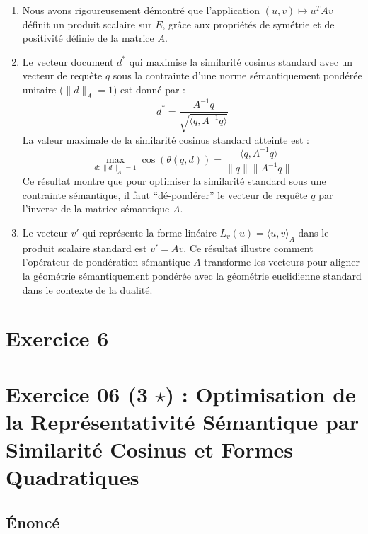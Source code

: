 \documentclass[11pt,a4paper]{report}
\begin{document}
\begin{enumerate}
\def\labelenumi{\arabic{enumi}.}
\item
  Nous avons rigoureusement démontré que l'application
  \((u, v) \mapsto u^T A v\) définit un produit scalaire sur \(E\),
  grâce aux propriétés de symétrie et de positivité définie de la
  matrice \(A\).
\item
  Le vecteur document \(d^*\) qui maximise la similarité cosinus
  standard avec un vecteur de requête \(q\) sous la contrainte d'une
  norme sémantiquement pondérée unitaire (\(\|d\|_A=1\)) est donné par :
  \[d^* = \frac{A^{-1} q}{\sqrt{\langle q, A^{-1} q \rangle}}\] La
  valeur maximale de la similarité cosinus standard atteinte est :
  \[\max_{d: \|d\|_A=1} \cos(\theta(q,d)) = \frac{\langle q, A^{-1} q \rangle}{\|q\| \|A^{-1} q\|}\]
  Ce résultat montre que pour optimiser la similarité standard sous une
  contrainte sémantique, il faut ``dé-pondérer'' le vecteur de requête
  \(q\) par l'inverse de la matrice sémantique \(A\).
\item
  Le vecteur \(v'\) qui représente la forme linéaire
  \(L_v(u) = \langle u, v \rangle_A\) dans le produit scalaire standard
  est \(v' = Av\). Ce résultat illustre comment l'opérateur de
  pondération sémantique \(A\) transforme les vecteurs pour aligner la
  géométrie sémantiquement pondérée avec la géométrie euclidienne
  standard dans le contexte de la dualité.
\end{enumerate}


\section*{Exercice 6}
\hypertarget{exercice-06-3-star-optimisation-de-la-repruxe9sentativituxe9-suxe9mantique-par-similarituxe9-cosinus-et-formes-quadratiques}{%
\section{\texorpdfstring{Exercice 06 (3 \(\star\)) : Optimisation de la
Représentativité Sémantique par Similarité Cosinus et Formes
Quadratiques}{Exercice 06 (3 \textbackslash star) : Optimisation de la Représentativité Sémantique par Similarité Cosinus et Formes Quadratiques}}\label{exercice-06-3-star-optimisation-de-la-repruxe9sentativituxe9-suxe9mantique-par-similarituxe9-cosinus-et-formes-quadratiques}}

\hypertarget{uxe9noncuxe9}{%
\subsection{Énoncé}\label{uxe9noncuxe9}}
\end{document}
